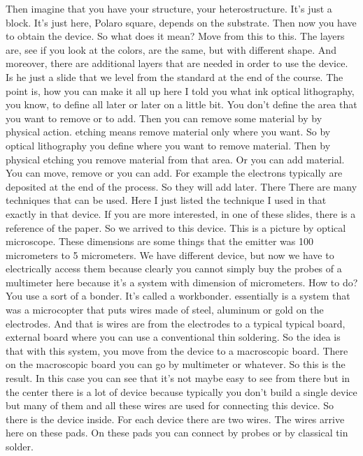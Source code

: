 Then imagine that you have your structure, your heterostructure. It's just a block. It's just here, Polaro square, depends on the substrate. Then now you have to obtain the device. So what does it mean? Move from this to this. The layers are, see if you look at the colors, are the same, but with different shape. And moreover, there are additional layers that are needed in order to use the device. Is he just a slide that we level from the standard at the end of the course. The point is, how you can make it all up here I told you what ink optical lithography, you know, to define all later or later on a little bit. You don't define the area that you want to remove or to add. Then you can remove some material by by physical action. etching means remove material only where you want. So by optical lithography you define where you want to remove material. Then by physical etching you remove material from that area. Or you can add material. You can move, remove or you can add. For example the electrons typically are deposited at the end of the process. So they will add later. There There are many techniques that can be used. Here I just listed the technique I used in that exactly in that device. If you are more interested, in one of these slides, there is a reference of the paper.
So we arrived to this device. This is a picture by optical microscope. These dimensions are some things that the emitter was 100 micrometers to 5 micrometers. We have different device, but now we have to electrically access them because clearly you cannot simply buy the probes of a multimeter here because it's a system with dimension of micrometers. How to do? You use a sort of a bonder. It's called a workbonder. essentially is a system that was a microcopter that puts wires made of steel, aluminum or gold on the electrodes. And that is wires are from the electrodes to a typical typical board, external board where you can use a conventional thin soldering. So the idea is that with this system, you move from the device to a macroscopic board. There on the macroscopic board you can go by multimeter or whatever. So this is the result. In this case you can see that it's not maybe easy to see from there but in the center there is a lot of device because typically you don't build a single device but many of them and all these wires are used for connecting this device. So there is the device inside. For each device there are two wires. The wires arrive here on these pads. On these pads you can connect by probes or by classical tin solder.
